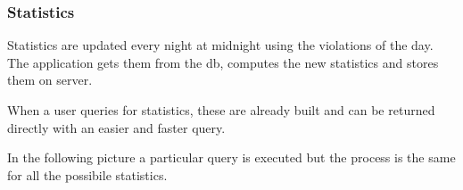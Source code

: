 \subsubsection{Statistics}
Statistics are updated every night at midnight using the violations of the day. The application gets them from the db, computes the new statistics and stores them on server.

When a user queries for statistics, these are already built and can be returned directly with an easier and faster query.

In the following picture a particular query is executed but the process is the same for all the possibile statistics.
